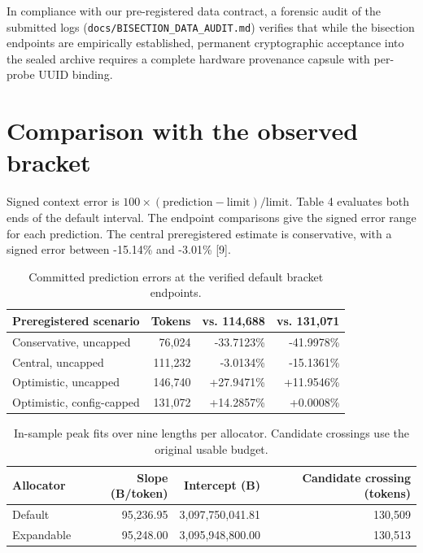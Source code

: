 \documentclass[11pt,a4paper]{article}
\begin{document}
In compliance with our pre-registered data contract, a forensic audit of the submitted logs (\texttt{docs/BISECTION\_DATA\_AUDIT.md}) verifies that while the bisection endpoints are empirically established, permanent cryptographic acceptance into the sealed archive requires a complete hardware provenance capsule with per-probe UUID binding.

\section{Comparison with the observed bracket}
Signed context error is $100 \times (\text{prediction} - \text{limit}) / \text{limit}$. Table 4 evaluates both ends of the default interval. The endpoint comparisons give the signed error range for each prediction. The central preregistered estimate is conservative, with a signed error between -15.14\% and -3.01\% [9].

\begin{table}[htbp]
\centering
\small
\caption{Committed prediction errors at the verified default bracket endpoints.}
\begin{tabular}{lrrr}
\toprule
\textbf{Preregistered scenario} & \textbf{Tokens} & \textbf{vs. 114,688} & \textbf{vs. 131,071} \\
\midrule
Conservative, uncapped & 76,024  & -33.7123\% & -41.9978\% \\
Central, uncapped      & 111,232 & -3.0134\%  & -15.1361\% \\
Optimistic, uncapped   & 146,740 & +27.9471\% & +11.9546\% \\
Optimistic, config-capped & 131,072 & +14.2857\% & +0.0008\% \\
\bottomrule
\end{tabular}
\end{table}

\begin{table}[htbp]
\centering
\small
\caption{In-sample peak fits over nine lengths per allocator. Candidate crossings use the original usable budget.}
\begin{tabular}{lrrr}
\toprule
\textbf{Allocator} & \textbf{Slope (B/token)} & \textbf{Intercept (B)} & \textbf{Candidate crossing (tokens)} \\
\midrule
Default    & 95,236.95 & 3,097,750,041.81 & 130,509 \\
Expandable & 95,248.00 & 3,095,948,800.00 & 130,513 \\
\bottomrule
\end{tabular}
\end{table}
\end{document}
